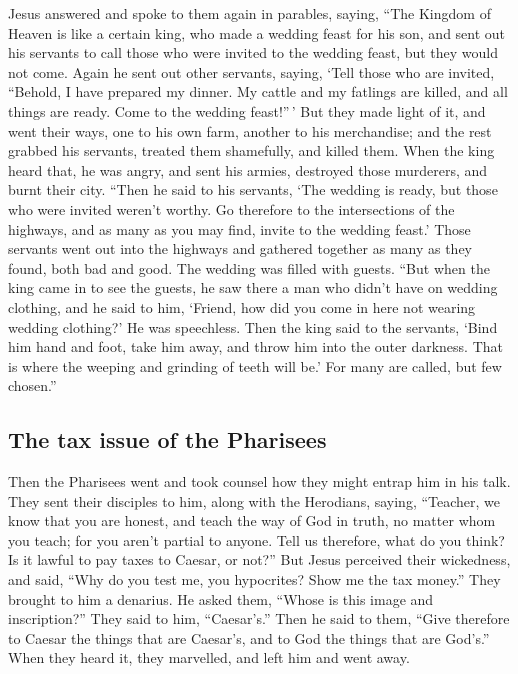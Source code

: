  Jesus answered and spoke to them again in parables,
saying,  ``The Kingdom of Heaven is like a certain king,
who made a wedding feast for his son,  and sent out his
servants to call those who were invited to the wedding feast, but they
would not come.  Again he sent out other servants, saying,
`Tell those who are invited, ``Behold, I have prepared my dinner. My
cattle and my fatlings are killed, and all things are ready. Come to the
wedding feast!''\,'  But they made light of it, and went
their ways, one to his own farm, another to his merchandise;
 and the rest grabbed his servants, treated them
shamefully, and killed them.  When the king heard that, he
was angry, and sent his armies, destroyed those murderers, and burnt
their city.  ``Then he said to his servants, `The wedding
is ready, but those who were invited weren't worthy.  Go
therefore to the intersections of the highways, and as many as you may
find, invite to the wedding feast.'  Those servants went
out into the highways and gathered together as many as they found, both
bad and good. The wedding was filled with guests.  ``But
when the king came in to see the guests, he saw there a man who didn't
have on wedding clothing,  and he said to him, `Friend,
how did you come in here not wearing wedding clothing?' He was
speechless.  Then the king said to the servants, `Bind
him hand and foot, take him away, and throw him into the outer darkness.
That is where the weeping and grinding of teeth will be.'
 For many are called, but few chosen.''

\hypertarget{the-tax-issue-of-the-pharisees}{%
\subsection{The tax issue of the
Pharisees}\label{the-tax-issue-of-the-pharisees}}

 Then the Pharisees went and took counsel how they might
entrap him in his talk.  They sent their disciples to
him, along with the Herodians, saying, ``Teacher, we know that you are
honest, and teach the way of God in truth, no matter whom you teach; for
you aren't partial to anyone.  Tell us therefore, what do
you think? Is it lawful to pay taxes to Caesar, or not?''
 But Jesus perceived their wickedness, and said, ``Why do
you test me, you hypocrites?  Show me the tax money.''
They brought to him a denarius.  He asked them, ``Whose
is this image and inscription?''  They said to him,
``Caesar's.'' Then he said to them, ``Give therefore to Caesar the
things that are Caesar's, and to God the things that are God's.''
 When they heard it, they marvelled, and left him and
went away.

